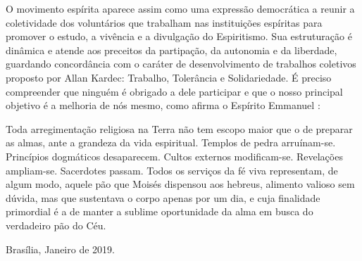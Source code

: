 O movimento espírita aparece assim como uma expressão democrática a reunir a coletividade dos voluntários que trabalham nas instituições espíritas para promover o estudo, a vivência e a divulgação do Espiritismo. Sua estruturação é dinâmica e atende aos preceitos da partipação, da autonomia e da liberdade, guardando concordância com o caráter de desenvolvimento de trabalhos coletivos proposto por Allan Kardec: Trabalho, Tolerância e Solidariedade. É preciso compreender que ninguém é obrigado a dele participar e que o nosso principal objetivo é a melhoria de nós mesmo, como afirma o Espírito Emmanuel \cite[João 6:32]{emmEvJoao}:

\begin{citacao}
Toda arregimentação religiosa na Terra não tem escopo maior que o de preparar as almas, ante a grandeza da vida espiritual.
Templos de pedra arruínam-se.
Princípios dogmáticos desaparecem.
Cultos externos modificam-se.
Revelações ampliam-se.
Sacerdotes passam.
Todos os serviços da fé viva representam, de algum modo, aquele pão que Moisés dispensou aos hebreus, alimento valioso sem dúvida, mas que sustentava o corpo apenas por um dia, e cuja finalidade primordial é a de manter a sublime oportunidade da alma em busca do verdadeiro pão do Céu.
\end{citacao}
 

\vspace{1,2cm}
\hspace{\fill} Brasília, Janeiro de 2019.